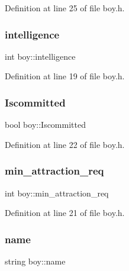 Definition at line 25 of file boy.\+h.

\mbox{\label{classboy_a3f66ab5d6e4d99adce1a8d33a4f2fb82}} 
\subsubsection{\texorpdfstring{intelligence}{intelligence}}
{\footnotesize\ttfamily int boy\+::intelligence}



Definition at line 19 of file boy.\+h.

\mbox{\label{classboy_a9eb8c2ade29520aec69b21ed659194bf}} 
\subsubsection{\texorpdfstring{Iscommitted}{Iscommitted}}
{\footnotesize\ttfamily bool boy\+::\+Iscommitted}



Definition at line 22 of file boy.\+h.

\mbox{\label{classboy_a363e2d52a8f745aa5650ddc0007a323c}} 
\subsubsection{\texorpdfstring{min\+\_\+attraction\+\_\+req}{min\_attraction\_req}}
{\footnotesize\ttfamily int boy\+::min\+\_\+attraction\+\_\+req}



Definition at line 21 of file boy.\+h.

\mbox{\label{classboy_abcc2bcb0cb3f0465f5001e549a14a861}} 
\subsubsection{\texorpdfstring{name}{name}}
{\footnotesize\ttfamily string boy\+::name}



